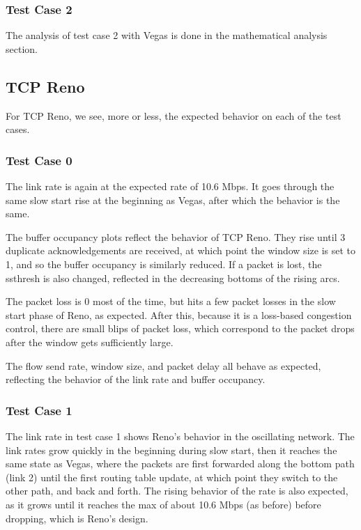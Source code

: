 \subsubsection{Test Case 2}
The analysis of test case 2 with Vegas is done in the mathematical analysis
section.


\subsection{TCP Reno}
For TCP Reno, we see, more or less, the expected behavior on each of the test
cases.

\subsubsection{Test Case 0}
The link rate is again at the expected rate of 10.6 Mbps. It goes through the
same slow start rise at the beginning as Vegas, after which the behavior
is the same.

The buffer occupancy plots reflect the behavior of TCP Reno. They rise until
3 duplicate acknowledgements are received, at which point the window size is
set to 1, and so the buffer occupancy is similarly reduced. If a packet is lost,
the ssthresh is also changed, reflected in the decreasing bottoms of the rising
arcs.

The packet loss is 0 most of the time, but hits a few packet losses in the slow
start phase of Reno, as expected. After this, because it is a loss-based
congestion control, there are small blips of packet loss, which correspond
to the packet drops after the window gets sufficiently large.

The flow send rate, window size, and packet delay all behave as expected,
reflecting the behavior of the link rate and buffer occupancy.

\subsubsection{Test Case 1}
The link rate in test case 1 shows Reno's behavior in the oscillating
network. The link rates grow quickly in the beginning during slow start,
then it reaches the same state as Vegas, where the packets are first forwarded
along the bottom path (link 2) until the first routing table update, at which
point they switch to the other path, and back and forth. The rising behavior
of the rate is also expected, as it grows until it reaches the max of
about 10.6 Mbps (as before) before dropping, which is Reno's design.

